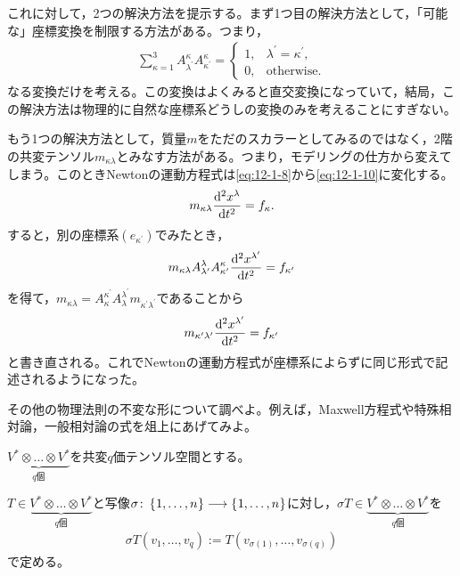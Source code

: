\documentclass[uplatex]{jsarticle}
\begin{document}
これに対して，2つの解決方法を提示する。まず1つ目の解決方法として，「可能な」座標変換を制限する方法がある。つまり，
\begin{align*}
  \sum_{\kappa=1}^{3} A_{\lambda^{\prime}}^{\kappa} A_{\kappa^{\prime}}^{\kappa} = \begin{cases}
    1, & \lambda^{\prime} = \kappa^{\prime}, \\
    0, & \text{otherwise}.
  \end{cases}
\end{align*}
なる変換だけを考える。この変換はよくみると直交変換になっていて，結局，この解決方法は物理的に自然な座標系どうしの変換のみを考えることにすぎない。

もう1つの解決方法として，質量$m$をただのスカラーとしてみるのではなく，2階の共変テンソル$m_{\kappa\lambda}$とみなす方法がある。つまり，モデリングの仕方から変えてしまう。このときNewtonの運動方程式は\eqref{eq:12-1-8}から\eqref{eq:12-1-10}に変化する。
\begin{align}
  m_{\kappa\lambda} \dfrac{\mathrm{d}^{2}x^{\lambda}}{\mathrm{d}t^{2}} = f_{\kappa}. \label{eq:12-1-10}
\end{align}
すると，別の座標系$(e_{\kappa^{\prime}})$でみたとき，
\begin{align}
  m_{\kappa \lambda} A^{\lambda}_{\lambda^{\prime}} A^{\kappa}_{\kappa^{\prime}} \dfrac{\mathrm{d}^{2} x^{\lambda^{\prime}}}{\mathrm{d}t^{2}} = f_{\kappa^{\prime}}
\end{align}
を得て，$m_{\kappa \lambda} = A_{\kappa}^{\kappa^{\prime}} A_{\lambda}^{\lambda^{\prime}} m_{\kappa^{\prime} \lambda^{\prime}}$であることから
\begin{align}
  m_{\kappa^{\prime}\lambda^{\prime}} \dfrac{\mathrm{d}^{2}x^{\lambda^{\prime}}}{\mathrm{d}t^{2}} = f_{\kappa^{\prime}}
\end{align}
と書き直される。これでNewtonの運動方程式が座標系によらずに同じ形式で記述されるようになった。

\sukima{} その他の物理法則の不変な形について調べよ。例えば，Maxwell方程式や特殊相対論，一般相対論の式を俎上にあげてみよ。


\sukima{}\par
$\underbrace{V^{*} \otimes \dots \otimes V^{*}}_{q\text{個}}$を共変$q$価テンソル空間とする。

\begin{teigi}
  $T \in \underbrace{V^{*} \otimes \dots \otimes V^{*}}_{q\text{個}}$と写像$\sigma \colon \Set{\hspace{-1.8pt} 1,\dots,n \hspace{-1.8pt}} \longrightarrow \Set{\hspace{-1.8pt} 1,\dots,n \hspace{-1.8pt}}$に対し，$\sigma T \in \underbrace{V^{*} \otimes \dots \otimes V^{*}}_{q\text{個}}$を
  \begin{align*}
    \sigma T (v_{1}, \dots, v_{q}) := T(v_{\sigma(1)}, \dots, v_{\sigma(q)})
  \end{align*}
  で定める。
\end{teigi}
\end{document}
